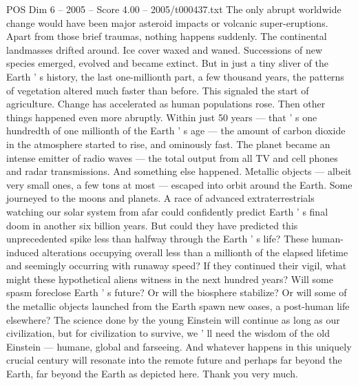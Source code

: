 \begin{textsample}{POS Dim 6 – 2005 – Score 4.00 – 2005/t000437.txt}
The only abrupt worldwide change would have been major asteroid impacts or volcanic super-eruptions.
Apart from those brief traumas, nothing happens suddenly.
The continental landmasses drifted around.
Ice cover waxed and waned.
Successions of new species emerged, evolved and became extinct.
But in just a tiny sliver of the Earth ' s history, the last one-millionth part, a few thousand years, the patterns of vegetation altered much faster than before.
This signaled the start of agriculture.
Change has accelerated as human populations rose.
Then other things happened even more abruptly.
Within just 50 years — that ' s one hundredth of one millionth of the Earth ' s age — the amount of carbon dioxide in the atmosphere started to rise, and ominously fast.
The planet became an intense emitter of radio waves — the total output from all TV and cell phones and radar transmissions.
And something else happened.
Metallic objects — albeit very small ones, a few tons at most — escaped into orbit around the Earth.
Some journeyed to the moons and planets.
A race of advanced extraterrestrials watching our solar system from afar could confidently predict Earth ' s final doom in another six billion years.
But could they have predicted this unprecedented spike less than halfway through the Earth ' s life?
These human-induced alterations occupying overall less than a millionth of the elapsed lifetime and seemingly occurring with runaway speed?
If they continued their vigil, what might these hypothetical aliens witness in the next hundred years?
Will some spasm foreclose Earth ' s future?
Or will the biosphere stabilize?
Or will some of the metallic objects launched from the Earth spawn new oases, a post-human life elsewhere?
The science done by the young Einstein will continue as long as our civilization, but for civilization to survive, we ' ll need the wisdom of the old Einstein — humane, global and farseeing.
And whatever happens in this uniquely crucial century will resonate into the remote future and perhaps far beyond the Earth, far beyond the Earth as depicted here.
Thank you very much.

\end{textsample}
